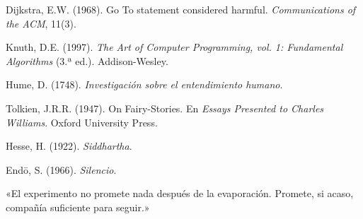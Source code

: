  Dijkstra, E.W. (1968). Go To statement considered harmful. \emph{Communications of the ACM}, 11(3).

 Knuth, D.E. (1997). \emph{The Art of Computer Programming, vol. 1: Fundamental Algorithms} (3.ª ed.). Addison-Wesley.

 Hume, D. (1748). \emph{Investigación sobre el entendimiento humano}.

 Tolkien, J.R.R. (1947). On Fairy-Stories. En \emph{Essays Presented to Charles Williams}. Oxford University Press.

 Hesse, H. (1922). \emph{Siddhartha}.

 Endō, S. (1966). \emph{Silencio}.

\findelexperimento
\begin{cita}\centering
«El experimento no promete nada después de la evaporación. Promete, si acaso, compañía suficiente para seguir.»
\end{cita}

